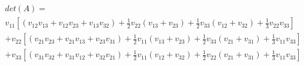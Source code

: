 \documentclass[review,supplement,hidelinks,onefignum,onetabnum]{siamart220329}
\begin{document}
\begin{equation}
    \begin{split}
    det(A) = \\
    v_{11}[\left(v_{12} v_{13} + v_{12} v_{23} + v_{13} v_{32}\right) + \frac{1}{2} v_{22} \left(v_{13} + v_{23}\right) + \frac{1}{2} v_{33} \left(v_{12} + v_{32}\right) + \frac{1}{3} v_{22} v_{33}] \\
    +v_{22}[\left(v_{21} v_{23} + v_{21} v_{13} + v_{23} v_{31}\right) + \frac{1}{2} v_{11} \left(v_{13} + v_{23}\right) + \frac{1}{2} v_{33} \left(v_{21} + v_{31}\right) + \frac{1}{3} v_{11} v_{33}] \\
    +v_{33}[\left(v_{31} v_{32} + v_{31} v_{12} + v_{32} v_{21}\right) + \frac{1}{2} v_{11} \left(v_{12} + v_{32}\right) + \frac{1}{2} v_{22} \left(v_{21} + v_{31}\right) + \frac{1}{3} v_{11} v_{33}]
    \end{split}
\end{equation}
\end{document}
